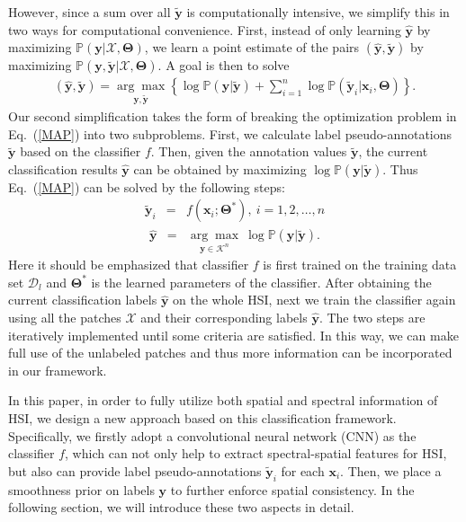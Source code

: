 \documentclass[journal]{IEEEtran}
\begin{document}
	However, since a sum over all $\widetilde{\mathbf{y}}$ is computationally intensive, we simplify this in two ways for computational convenience. First, instead of only learning $\widehat{\mathbf{y}}$ {{by maximizing $\mathbb{P}(\mathbf{y}|\mathbf{\mathcal{X}},\boldsymbol{\Theta})$}}, we learn a point estimate of the pairs $(\widehat{\mathbf{y}},\widetilde{\mathbf{y}})$ {{by maximizing $\mathbb{P}(\mathbf{y},\widetilde{\mathbf{y}}|\mathbf{\mathcal{X}},\boldsymbol{\Theta})$}}. A goal is then to solve
	\begin{eqnarray}\label{MAP}
	(\widehat{\mathbf{y}},\widetilde{\mathbf{y}})=\underset{\mathbf{y},\widetilde{\mathbf{y}}}{\arg\max}\left\{\log\mathbb{P}(\mathbf{y}|\widetilde{\mathbf{y}}) + \sum_{i=1}^{n}\log\mathbb{P}(\widetilde{\mathbf{y}}_i|\mathbf{x}_{i},\boldsymbol{\Theta})\right\}.
	\end{eqnarray}
	Our second simplification takes the form of breaking the optimization problem in Eq.\ (\ref{MAP}) into two subproblems. First, we calculate label {{pseudo-annotations $\widetilde{\mathbf{y}}$ based on the classifier $f$. Then, given the annotation values $\widetilde{\mathbf{y}}$, the {{current classification results $\widehat{\mathbf{y}}$}} can be obtained by maximizing $\log\mathbb{P}(\mathbf{y}|\widetilde{\mathbf{y}})$. Thus Eq.\ (\ref{MAP}) can be solved by the following steps:
	\begin{eqnarray}\label{MAP1}
		\widetilde{\mathbf{y}}_i &=& f(\mathbf{x}_{i};\boldsymbol{\Theta}^{*}),~i=1,2,\dots,n
	\end{eqnarray}
	\begin{eqnarray}\label{MAP2}
		\widehat{\mathbf{y}} &=& \underset{\mathbf{y}\in\mathcal{K}^{n}}{\arg\max}~\log\mathbb{P}(\mathbf{y}|\widetilde{\mathbf{y}}).
	\end{eqnarray}
	Here it should be emphasized that classifier $f$ is first trained on the training data set $\mathbf{\mathcal{D}}_{l}$ and $\boldsymbol{\Theta}^{*}$ is the learned parameters of the classifier. After obtaining the current classification labels $\widehat{\mathbf{y}}$ on the whole HSI, next we train the classifier again using all the patches $\mathbf{\mathcal{X}}$ and their corresponding labels $\widehat{\mathbf{y}}$. The two steps are iteratively implemented until some criteria are satisfied. In this way, we can make full use of the unlabeled patches and thus more information can be incorporated in our framework.}}
	
	In this paper, in order to fully utilize both spatial and spectral information of HSI, we design a new approach based on this classification framework. Specifically, we firstly {{adopt a convolutional neural network (CNN) as the classifier $f$, which can not only help to extract spectral-spatial features for HSI, but also can provide label pseudo-annotations $\widetilde{\mathbf{y}}_i$ for each $\mathbf{x}_{i}$. Then, we place a smoothness prior on labels $\mathbf{y}$ to further enforce spatial consistency. In the following section, we will introduce these two aspects in detail.}} 
	
\end{document}
